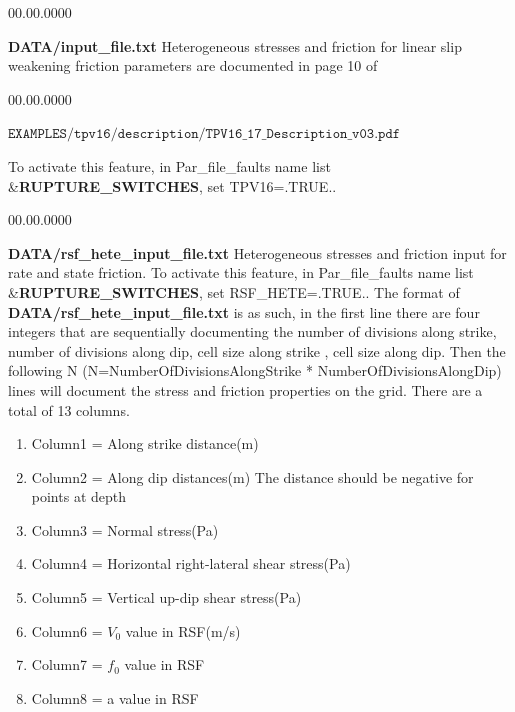 \begin{lyxlist}{00.00.0000}
\item [{\textbf{DATA/input\_file.txt}}] Heterogeneous stresses and friction for
linear slip weakening friction
parameters are documented in page 10 of

\begin{lyxlist}{00.00.0000}
\item [{$\mathtt{EXAMPLES/tpv16/description/TPV16\_17\_Description\_v03.pdf}$}]~
\end{lyxlist}

To activate this feature, in Par\_file\_faults name list \&\textbf{RUPTURE\_SWITCHES}, set TPV16=.TRUE..

\end{lyxlist}
\begin{lyxlist}{00.00.0000}
\item [{\textbf{DATA/rsf\_hete\_input\_file.txt}}]  Heterogeneous stresses and friction input for
  rate and state friction.
To activate this feature, in Par\_file\_faults name list \&\textbf{RUPTURE\_SWITCHES}, set RSF\_HETE=.TRUE..
  The format of  {\textbf{DATA/rsf\_hete\_input\_file.txt}} is as such, in the first line there are four integers
  that are sequentially documenting the number of divisions along strike, number of divisions along
  dip, cell size along strike , cell size along dip. Then the following N (N=NumberOfDivisionsAlongStrike
  * NumberOfDivisionsAlongDip) lines will document the stress and friction properties on the grid.
  There are a total of 13 columns.
  \begin{enumerate}
  \item{Column1} = Along strike distance(m)

  \item{Column2} = Along dip distances(m) The distance should be negative for points at depth

  \item{Column3} = Normal stress(Pa)

  \item{Column4} = Horizontal right-lateral shear stress(Pa)

  \item{Column5} = Vertical up-dip shear stress(Pa)

  \item{Column6} = $V_0$ value in RSF(m/s)

  \item{Column7} = $f_0$ value in RSF

  \item{Column8} = a value in RSF


\end{enumerate}
\end{lyxlist}
